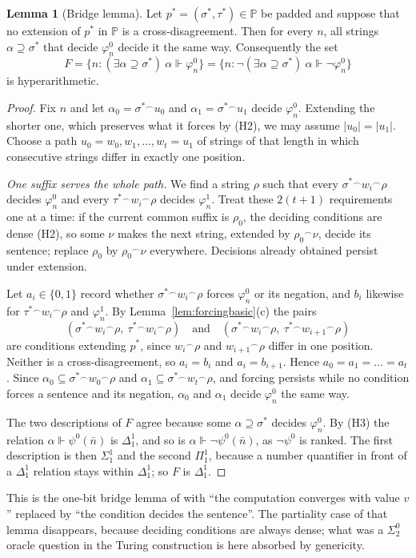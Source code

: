 \documentclass[11pt,letterpaper]{article}
\theoremstyle{definition}
\newtheorem{lemma}[definition]{Lemma}
\numberwithin{equation}{section}
\newcommand{\cat}{\mathbin{{}^\frown}}
\newcommand{\Dh}{\Delta^1_1}
\newcommand{\forces}{\Vdash}
\newcommand{\PP}{\mathbb P}
\begin{document}
\begin{lemma}[Bridge lemma]\label{lem:bridge}
Let $p^*=(\sigma^*,\tau^*)\in\PP$ be padded and suppose that no extension of $p^*$ in $\PP$ is a cross-disagreement. Then for every $n$, all strings $\alpha\supseteq\sigma^*$ that decide $\varphi^0_n$ decide it the same way. Consequently the set
\[
 F=\{n:(\exists\alpha\supseteq\sigma^*)\ \alpha\forces\varphi^0_n\}
 =\{n:\neg(\exists\alpha\supseteq\sigma^*)\ \alpha\forces\neg\varphi^0_n\}
\]
is hyperarithmetic.
\end{lemma}
\begin{proof}
Fix $n$ and let $\alpha_0=\sigma^*\cat u_0$ and $\alpha_1=\sigma^*\cat u_1$ decide $\varphi^0_n$. Extending the shorter one, which preserves what it forces by (H2), we may assume $|u_0|=|u_1|$. Choose a path $u_0=w_0,w_1,\dots,w_t=u_1$ of strings of that length in which consecutive strings differ in exactly one position.

\emph{One suffix serves the whole path.} We find a string $\rho$ such that every $\sigma^*\cat w_i\cat\rho$ decides $\varphi^0_n$ and every $\tau^*\cat w_i\cat\rho$ decides $\varphi^1_n$. Treat these $2(t+1)$ requirements one at a time: if the current common suffix is $\rho_0$, the deciding conditions are dense (H2), so some $\nu$ makes the next string, extended by $\rho_0\cat\nu$, decide its sentence; replace $\rho_0$ by $\rho_0\cat\nu$ everywhere. Decisions already obtained persist under extension.

Let $a_i\in\{0,1\}$ record whether $\sigma^*\cat w_i\cat\rho$ forces $\varphi^0_n$ or its negation, and $b_i$ likewise for $\tau^*\cat w_i\cat\rho$ and $\varphi^1_n$. By Lemma~\ref{lem:forcingbasic}(c) the pairs
\[
 (\sigma^*\cat w_i\cat\rho,\ \tau^*\cat w_i\cat\rho)\quad\text{and}\quad(\sigma^*\cat w_i\cat\rho,\ \tau^*\cat w_{i+1}\cat\rho)
\]
are conditions extending $p^*$, since $w_i\cat\rho$ and $w_{i+1}\cat\rho$ differ in one position. Neither is a cross-disagreement, so $a_i=b_i$ and $a_i=b_{i+1}$. Hence $a_0=a_1=\dots=a_t$. Since $\alpha_0\subseteq\sigma^*\cat w_0\cat\rho$ and $\alpha_1\subseteq\sigma^*\cat w_t\cat\rho$, and forcing persists while no condition forces a sentence and its negation, $\alpha_0$ and $\alpha_1$ decide $\varphi^0_n$ the same way.

The two descriptions of $F$ agree because some $\alpha\supseteq\sigma^*$ decides $\varphi^0_n$. By (H3) the relation $\alpha\forces\psi^0(\bar n)$ is $\Dh$, and so is $\alpha\forces\neg\psi^0(\bar n)$, as $\neg\psi^0$ is ranked. The first description is then $\Sigma^1_1$ and the second $\Pi^1_1$, because a number quantifier in front of a $\Dh$ relation stays within $\Dh$; so $F$ is $\Dh$.
\end{proof}
This is the one-bit bridge lemma of \cite[Lemma~8.3]{Synthesis} with ``the computation converges with value $v$'' replaced by ``the condition decides the sentence''. The partiality case of that lemma disappears, because deciding conditions are always dense; what was a $\Sigma^0_2$ oracle question in the Turing construction is here absorbed by genericity.
\end{document}
